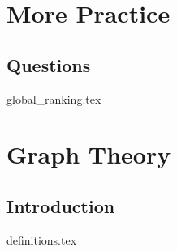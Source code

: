 \documentclass{exam}
\begin{document}

\section{More Practice}
\subsection{Questions}
\begin{questions}
{global_ranking.tex}
\end{questions}

\section{Graph Theory}
\subsection{Introduction}
\begin{questions}
{definitions.tex}
\end{questions}


\end{document}

